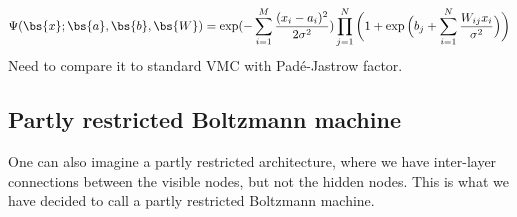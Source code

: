 \begin{equation}
\Psi(\bs{x};\bs{a},\bs{b},\bs{W})=\exp(-\sum_{i=1}^M\frac{(x_i-a_i)^2}{2\sigma^2})\prod_{j=1}^N\bigg(1+\exp\Big(b_j+\sum_{i=1}^N\frac{W_{ij}x_i}{\sigma^2}\Big)\bigg)
\label{eq:NQSWF}
\end{equation}
Need to compare it to standard VMC with Padé-Jastrow factor. 



\subsection{Partly restricted Boltzmann machine}
One can also imagine a partly restricted architecture, where we have inter-layer connections between the visible nodes, but not the hidden nodes. This is what we have decided to call a partly restricted Boltzmann machine. 

